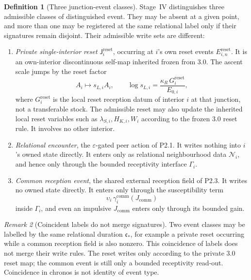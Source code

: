 \documentclass[11pt,a4paper]{article}
\theoremstyle{definition}
\newtheorem{definition}{Definition}[section]
\theoremstyle{plain}
\theoremstyle{remark}
\newtheorem{remark}[definition]{Remark}
\begin{document}
\begin{definition}[Three junction-event classes]\label{def:junctions}
Stage~IV distinguishes three admissible classes of distinguished event. They may
be absent at a given point, and more than one may be registered at the same
relational label only if their signatures remain disjoint. Their admissible write
sets are different:
\begin{enumerate}[label=\textup{(\arabic*)},leftmargin=1.2cm]
\item \emph{Private single-interior reset} \(\mathsf J^{\mathrm{reset}}_{i}\), occurring at
\(i\)'s own reset events \(E^{\mathrm{reset}}_{i,n}\). It is an own-interior
discontinuous self-map inherited frozen from 3.0. The ascent scale jumps by the
reset factor
\[
A_i\longmapsto s_{L,i}A_i,
\qquad
\log s_{L,i}
=
\frac{\kappa_R\,G_i^{\mathrm{reset}}}{E_{0,i}},
\]
where \(G_i^{\mathrm{reset}}\) is the local reset reception datum of interior \(i\)
at that junction, not a transferable stock. The admissible reset may also update
the inherited local reset variables such as \(\lambda_{S,i},H_{K,i},W_i\) according
to the frozen 3.0 reset rule. It involves no other interior.
\item \emph{Relational encounter}, the \(\varepsilon\)-gated peer action of P2.1.
It writes nothing into \(i\)'s owned state directly. It enters only as relational
neighbourhood data \(\mathcal N_i\), and hence only through the bounded
receptivity interface \(\Gamma_i\).
\item \emph{Common reception event}, the shared external reception field of P2.3.
It writes no owned state directly. It enters only through the susceptibility term
\[
\upsilon_i\,\gamma_i^{\mathrm{comm}}(J_{\mathrm{comm}})
\]
inside \(\Gamma_i\), and even an impulsive \(J_{\mathrm{comm}}\) enters only through
its bounded gain.
\end{enumerate}
\end{definition}

\begin{remark}[Coincident labels do not merge signatures]
Two event classes may be labelled by the same relational duration
\(\mathfrak c_*\), for example a private reset occurring while a common reception
field is also nonzero. This coincidence of labels does not merge their write rules.
The reset writes only according to the private 3.0 reset map; the common event is
still only a bounded receptivity read-out. Coincidence in chronos is not identity
of event type.
\end{remark}
\end{document}
